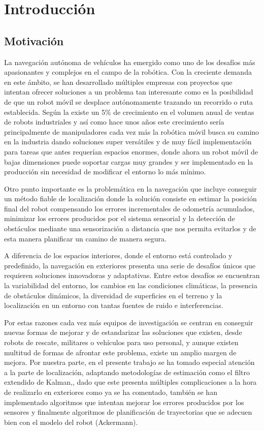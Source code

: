 \chapter{Introducción}

\section{Motivación}

\noindent 

La navegación autónoma de vehículos ha emergido como uno de los desafíos más apasionantes y complejos en el campo de la robótica. 
Con la creciente demanda en este ámbito, se han desarrollado múltiples empresas con proyectos que intentan ofrecer soluciones a un 
problema tan interesante como es la posibilidad de que un robot móvil se desplace autónomamente trazando un recorrido o ruta establecida. 
Según la \cite{IFR23} existe un 5\% de crecimiento en el volumen anual de ventas de robots industriales y así como hace unos años este crecimiento 
sería principalmente de manipuladores cada vez más la robótica móvil busca su camino en la industria dando soluciones super versátiles y de muy fácil 
implementación para tareas que antes requerían espacios enormes, donde ahora un robot móvil de bajas dimensiones puede soportar cargas muy grandes 
y ser implementado en la producción sin necesidad de modificar el entorno lo más mínimo. 

Otro punto importante es la problemática en la navegación que incluye conseguir un método fiable de localización donde la solución consiste en estimar la posición final del
robot compensando los errores incrementales de odometría acumulados, minimizar los errores producidos por el sistema sensorial y la detección de 
obstáculos mediante una sensorización a distancia que nos permita evitarlos y de esta manera planificar un camino de manera segura.

A diferencia de los espacios interiores, donde el entorno está controlado y predefinido, la navegación en exteriores presenta una serie de 
desafíos únicos que requieren soluciones innovadoras y adaptativas. Entre estos desafíos se encuentran la variabilidad del entorno, los 
cambios en las condiciones climáticas, la presencia de obstáculos dinámicos, la diversidad de superficies en el terreno y la localización 
en un entorno con tantas fuentes de ruido e interferencias.


Por estas razones cada vez más equipos de investigación se centran en conseguir nuevas formas de mejorar y de estandarizar las soluciones 
que existen, desde robots de rescate, militares o vehículos para uso personal, y aunque existen multitud de formas de afrontar este 
problema, existe un amplio margen de mejora. Por nuestra parte, en el presente trabajo se ha tomado especial atención a la parte de localización,
adaptando metodologías de estimación como el filtro extendido de Kalman,\Cite{Rolan20}, dado que este presenta múltiples complicaciones a la hora de
 realizarlo en exteriores como ya se ha comentado, también se han implementado algoritmos que intentan mejorar los errores producidos por los sensores y
finalmente algoritmos de planificación de trayectorias que se adecuen bien con el modelo del robot (Ackermann).

